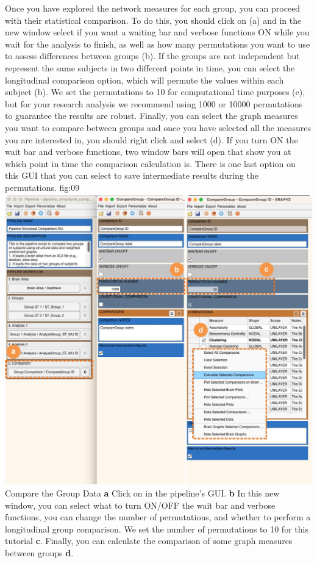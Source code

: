 \documentclass[justified]{tufte-handout}
\begin{document}
Once you have explored the network measures for each group, you can proceed with their statistical comparison. To do this, you should click on  (a) and in the new window select if you want a waiting bar and verbose functions ON while you wait for the analysis to finish, as well as how many permutations you want to use to assess differences between groups ({b}). If the groups are not independent but represent the same subjects in two different points in time, you can select the longitudinal comparison option, which will permute the values within each subject ({b}). We set the permutations to 10 for computational time purposes ({c}), but for your research analysis we recommend using 1000 or 10000 permutations to guarantee the results are robust. Finally, you can select the graph measures you want to compare between groups and once you have selected all the measures you are interested in, you should right click and select  ({d}). If you turn ON the wait bar and verbose functions, two window bars will open that show you at which point in time the comparison calculation is. There is one last option on this GUI that you can select to save intermediate results during the permutations.
	{fig:09}
	{
	\includegraphics{fig09.jpg}
	}
	{Compare the Group Data}
	{
	{\bf a} Click on  in the pipeline's GUI.
	{\bf b} In this new window, you can select what to turn ON/OFF the wait bar and verbose functions, you can change the number of permutations, and whether to perform a longitudinal group comparison. We set the number of permutations to 10 for this tutorial {\bf c}. Finally, you can calculate the comparison of some graph measures between groups {\bf d}.
	}
 
\end{document}
